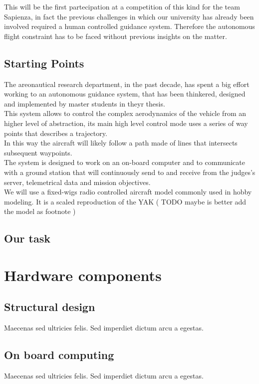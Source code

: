 \documentclass[oneside,onecolumn]{article}
\begin{document}
This will be the first partecipation at a competition of this kind for the team
Sapienza, in fact the previous challenges in which our university has already
been involved required a human controlled guidance system.
Therefore the autonomous flight constraint has to be faced without previous
insights on the matter.

\subsection{Starting Points}
The areonautical research department, in the past decade, has spent a big
effort working to an autonomous guidance system, that has been thinkered,
designed and implemented by master students in theyr thesis.\\
This system allows to control the complex aerodynamics of the vehicle from an
higher level of abstraction, its main high level control mode uses a series of
way points that describes a trajectory.\\
\bigskip
In this way the aircraft will likely follow a path made of lines that intersects subsequent waypoints.\\
The system is designed to work on an on-board computer and to communicate with a
ground station that will continuously send to and receive from the judges's
server, telemetrical data and mission objectives.\\
We will use a fixed-wigs radio controlled aircraft model commonly used in hobby
modeling. It is a scaled reproduction of the YAK (   TODO maybe is better add
the model as footnote   )




\subsection{Our task}


\section{Hardware components}
\subsection{Structural design}
Maecenas sed ultricies felis. Sed imperdiet dictum arcu a egestas. 
\subsection{On board computing}
Maecenas sed ultricies felis. Sed imperdiet dictum arcu a egestas. 
\end{document}
